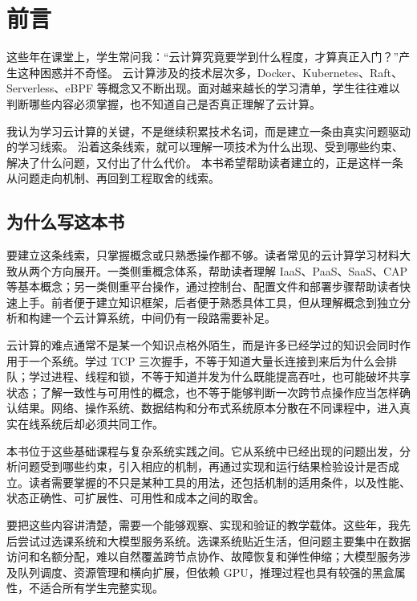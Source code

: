 
\section*{前言}

这些年在课堂上，学生常问我：“云计算究竟要学到什么程度，才算真正入门？”产生这种困惑并不奇怪。
云计算涉及的技术层次多，Docker、Kubernetes、Raft、Serverless、eBPF 等概念又不断出现。面对越来越长的学习清单，学生往往难以判断哪些内容必须掌握，也不知道自己是否真正理解了云计算。

我认为学习云计算的关键，不是继续积累技术名词，而是建立一条由真实问题驱动的学习线索。
沿着这条线索，就可以理解一项技术为什么出现、受到哪些约束、解决了什么问题，又付出了什么代价。
本书希望帮助读者建立的，正是这样一条从问题走向机制、再回到工程取舍的线索。

\subsection*{为什么写这本书}

要建立这条线索，只掌握概念或只熟悉操作都不够。读者常见的云计算学习材料大致从两个方向展开。一类侧重概念体系，帮助读者理解 IaaS、PaaS、SaaS、CAP 等基本概念；另一类侧重平台操作，通过控制台、配置文件和部署步骤帮助读者快速上手。前者便于建立知识框架，后者便于熟悉具体工具，但从理解概念到独立分析和构建一个云计算系统，中间仍有一段路需要补足。

云计算的难点通常不是某一个知识点格外陌生，而是许多已经学过的知识会同时作用于一个系统。学过 TCP 三次握手，不等于知道大量长连接到来后为什么会排队；学过进程、线程和锁，不等于知道并发为什么既能提高吞吐，也可能破坏共享状态；了解一致性与可用性的概念，也不等于能够判断一次跨节点操作应当怎样确认结果。网络、操作系统、数据结构和分布式系统原本分散在不同课程中，进入真实在线系统后却必须共同工作。

本书位于这些基础课程与复杂系统实践之间。它从系统中已经出现的问题出发，分析问题受到哪些约束，引入相应的机制，再通过实现和运行结果检验设计是否成立。读者需要掌握的不只是某种工具的用法，还包括机制的适用条件，以及性能、状态正确性、可扩展性、可用性和成本之间的取舍。

要把这些内容讲清楚，需要一个能够观察、实现和验证的教学载体。这些年，我先后尝试过选课系统和大模型服务系统。选课系统贴近生活，但问题主要集中在数据访问和名额分配，难以自然覆盖跨节点协作、故障恢复和弹性伸缩；大模型服务涉及队列调度、资源管理和横向扩展，但依赖 GPU，推理过程也具有较强的黑盒属性，不适合所有学生完整实现。

